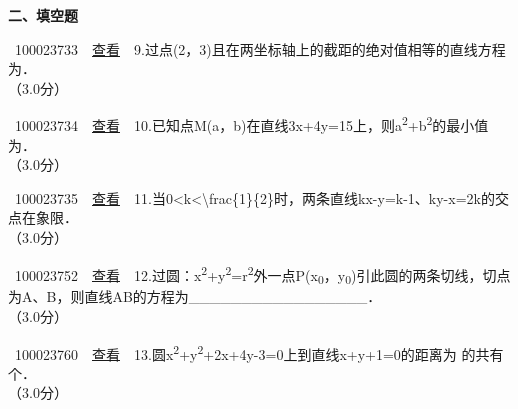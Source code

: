 \documentclass[]{article}
\begin{document}
\textbf{二、填空题}

~100023733~~\href{../question/viewQuestionDetail.jsp?questionID=100023733\&testPaperId=100229072}{查看}~~9.过点(2，3)且在两坐标轴上的截距的绝对值相等的直线方程为．\\
\hspace*{0.333em}\hspace*{0.333em}（3.0分）

~100023734~~\href{../question/viewQuestionDetail.jsp?questionID=100023734\&testPaperId=100229072}{查看}~~10.已知点M(a，b)在直线3x+4y=15上，则a\textsuperscript{2}+b\textsuperscript{2}的最小值为．\\
\hspace*{0.333em}\hspace*{0.333em}（3.0分）

~100023735~~\href{../question/viewQuestionDetail.jsp?questionID=100023735\&testPaperId=100229072}{查看}~~11.当0\textless{}k\textless{}\textbackslash{}frac\{1\}\{2\}时，两条直线kx-y=k-1、ky-x=2k的交点在象限．\\
\hspace*{0.333em}\hspace*{0.333em}（3.0分）

~100023752~~\href{../question/viewQuestionDetail.jsp?questionID=100023752\&testPaperId=100229072}{查看}~~12.过圆：x\textsuperscript{2}+y\textsuperscript{2}=r\textsuperscript{2}外一点P(x\textsubscript{0}，y\textsubscript{0})引此圆的两条切线，切点为A、B，则直线AB的方程为\_\_\_\_\_\_\_\_\_\_\_\_\_\_\_\_\_．\\
\hspace*{0.333em}\hspace*{0.333em}（3.0分）

~100023760~~\href{../question/viewQuestionDetail.jsp?questionID=100023760\&testPaperId=100229072}{查看}~~13.圆x\textsuperscript{2}+y\textsuperscript{2}+2x+4y-3=0上到直线x+y+1=0的距离为
的共有个．\\
\hspace*{0.333em}\hspace*{0.333em}（3.0分）

~

~

~

~

~
\end{document}
